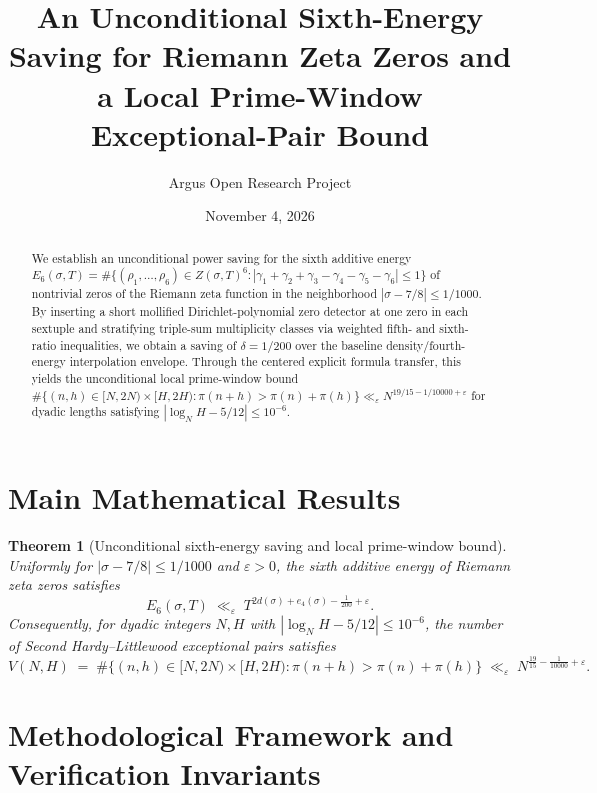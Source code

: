 \documentclass[10pt,reqno]{amsart}
\title[Sixth-Energy Saving for Zeta Zeros and Prime-Window Bound]
{An Unconditional Sixth-Energy Saving for Riemann Zeta Zeros and a Local Prime-Window Exceptional-Pair Bound}
\author{Argus Open Research Project}
\date{November 4, 2026}
\newtheorem{theorem}{Theorem}[section]
\theoremstyle{definition}
\begin{document}
\begin{abstract}
We establish an unconditional power saving for the sixth additive energy $E_6(\sigma,T) = \#\{(\rho_1,\ldots,\rho_6) \in Z(\sigma,T)^6 : |\gamma_1+\gamma_2+\gamma_3-\gamma_4-\gamma_5-\gamma_6| \le 1\}$ of nontrivial zeros of the Riemann zeta function in the neighborhood $|\sigma - 7/8| \le 1/1000$. By inserting a short mollified Dirichlet-polynomial zero detector at one zero in each sextuple and stratifying triple-sum multiplicity classes via weighted fifth- and sixth-ratio inequalities, we obtain a saving of $\delta = 1/200$ over the baseline density/fourth-energy interpolation envelope. Through the centered explicit formula transfer, this yields the unconditional local prime-window bound $\#\{(n,h) \in [N,2N)\times[H,2H) : \pi(n+h) > \pi(n)+\pi(h)\} \ll_\varepsilon N^{19/15 - 1/10000 + \varepsilon}$ for dyadic lengths satisfying $|\log_N H - 5/12| \le 10^{-6}$.
\end{abstract}
\maketitle

\section{Main Mathematical Results}
\begin{theorem}[Unconditional sixth-energy saving and local prime-window bound]
Uniformly for $|\sigma - 7/8| \le 1/1000$ and $\varepsilon > 0$, the sixth additive energy of Riemann zeta zeros satisfies
\[
  E_6(\sigma,T) \;\ll_\varepsilon\; T^{2d(\sigma) + e_4(\sigma) - \frac{1}{200} + \varepsilon}.
\]
Consequently, for dyadic integers $N,H$ with $|\log_N H - 5/12| \le 10^{-6}$, the number of Second Hardy--Littlewood exceptional pairs satisfies
\[
  V(N,H) \;=\; \#\bigl\{(n,h) \in [N,2N)\times[H,2H) : \pi(n+h) > \pi(n)+\pi(h)\bigr\} \;\ll_\varepsilon\; N^{\frac{19}{15} - \frac{1}{10000} + \varepsilon}.
\]
\end{theorem}

\section{Methodological Framework and Verification Invariants}
\end{document}
